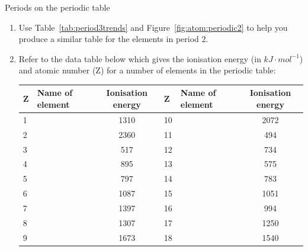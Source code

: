 \begin{exercises}{Periods on the periodic table} \noindent
\begin{enumerate}[noitemsep, label=\textbf{\arabic*}. ]
\item Use Table~\ref{tab:period3trends} and Figure~\ref{fig:atom:periodic2} to help you produce a similar table for the elements in period 2.
\item Refer to the data table below which gives the ionisation energy (in $kJ \cdot mol^{-1}$) and atomic number (Z) for a number of elements in the periodic table:\\
\begin{center}
\begin{tabular}{|l|l|c|l|l|c|}\hline
\textbf{Z} & Name of element & Ionisation energy & \textbf{Z} & Name of element & Ionisation energy \\\hline
1 &   & 1310 & 10 &        & 2072 \\\hline
2 &     & 2360 & 11 &      & 494  \\\hline
3 &    & 517  & 12 &   & 734  \\\hline
4 &  & 895  & 13 &   & 575  \\\hline
5 &      & 797  & 14 &     & 783  \\\hline
6 &     & 1087 & 15 &  & 1051 \\\hline
7 &   & 1397 & 16 &     & 994  \\\hline
8 &     & 1307 & 17 &    & 1250 \\\hline
9 &   & 1673 & 18 &       & 1540 \\\hline
\end{tabular}
\end{center}


\end{enumerate}
\end{exercises}
